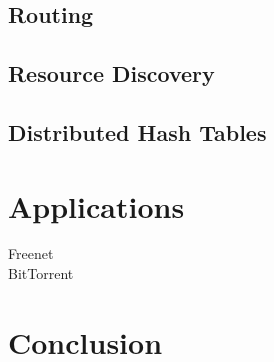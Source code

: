 \documentclass[12pt,letterpaper]{article}
\begin{document}
\subsection{Routing}

\subsection{Resource Discovery}

\subsection{Distributed Hash Tables}

\section{Applications}

Freenet\\
BitTorrent\\

\section{Conclusion}
\end{document}
